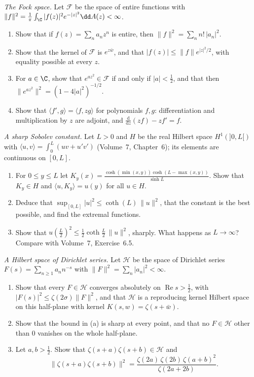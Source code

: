 \begin{exercise}[$\star\star$]\label{pb:fock}
\emph{The Fock space.} Let $\mathcal F$ be the space of entire functions with $\|f\|^2=\frac1\pi\int_\C|f(z)|^2e^{-|z|^2}\dd A(z)<\infty$.
\begin{enumerate}[label=(\alph*)]
\item Show that if $f(z)=\sum_na_nz^n$ is entire, then $\|f\|^2=\sum_nn!\,|a_n|^2$.
\item Show that the kernel of $\mathcal F$ is $e^{z\bar w}$, and that $|f(z)|\le\|f\|e^{|z|^2/2}$, with equality possible at every $z$.
\item For $a\in\C$, show that $e^{az^2}\in\mathcal F$ if and only if $|a|<\frac12$, and that then $\|e^{az^2}\|^2=(1-4|a|^2)^{-1/2}$.
\item Show that $\langle f',g\rangle=\langle f,zg\rangle$ for polynomials $f,g$: differentiation and multiplication by $z$ are adjoint, and
$\frac{\mathrm d}{\mathrm dz}(zf)-zf'=f$.
\end{enumerate}
\end{exercise}

\begin{exercise}[$\star\star$]\label{pb:sobolev}
\emph{A sharp Sobolev constant.} Let $L>0$ and $H$ be the real Hilbert space $H^1(]0,L[)$ with $\langle u,v\rangle=\int_0^L(uv+u'v')$ (Volume~7, Chapter~6);
its elements are continuous on $[0,L]$.
\begin{enumerate}[label=(\alph*)]
\item For $0\le y\le L$ let $K_y(x)=\frac{\cosh(\min(x,y))\cosh(L-\max(x,y))}{\sinh L}$. Show that $K_y\in H$ and $\langle u,K_y\rangle=u(y)$ for all $u\in H$.
\item Deduce that $\sup_{[0,L]}|u|^2\le\coth(L)\,\|u\|^2$, that the constant is the best possible, and find the extremal functions.
\item Show that $u(\frac L2)^2\le\frac12\coth\frac L2\,\|u\|^2$, sharply. What happens as $L\to\infty$? Compare with Volume~7, Exercise~6.5.
\end{enumerate}
\end{exercise}

\begin{exercise}[$\star\star$]\label{pb:dirichlet}
\emph{A Hilbert space of Dirichlet series.} Let $\mathcal H$ be the space of Dirichlet series $F(s)=\sum_{n\ge1}a_nn^{-s}$ with $\|F\|^2=\sum_n|a_n|^2<\infty$.
\begin{enumerate}[label=(\alph*)]
\item Show that every $F\in\mathcal H$ converges absolutely on $\operatorname{Re}s>\frac12$, with $|F(s)|^2\le\zeta(2\sigma)\|F\|^2$, and that $\mathcal H$ is a reproducing
kernel Hilbert space on this half-plane with kernel $K(s,w)=\zeta(s+\bar w)$.
\item Show that the bound in (a) is sharp at every point, and that no $F\in\mathcal H$ other than $0$ vanishes on the whole half-plane.
\item Let $a,b>\frac12$. Show that $\zeta(s+a)\zeta(s+b)\in\mathcal H$ and
\[
\|\zeta(s+a)\zeta(s+b)\|^2=\frac{\zeta(2a)\,\zeta(2b)\,\zeta(a+b)^2}{\zeta(2a+2b)}.
\]
\end{enumerate}
\end{exercise}

